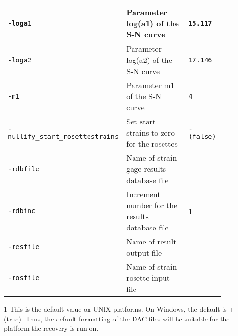 \begin{threeparttable}[b]
\begin{tabular}{|>{\raggedright} p{0.23\linewidth}| p{0.48\linewidth}| p{0.18\linewidth}|}
  \hline
  \texttt{-loga1} &    Parameter log(a1) of the S-N curve  & \texttt{15.117}   \\
  \hline
  \texttt{-loga2} &    Parameter log(a2) of the S-N curve  & \texttt{17.146}   \\
  \hline
  \texttt{-m1} &    Parameter m1 of the S-N curve  & \texttt{4}   \\
  \hline
  \texttt{-nullify\_start\_}\newline\texttt{rosettestrains} &    Set start strains to zero for the rosettes  & \texttt{- (false)}   \\
  \hline
  {\tt-rdbfile} & Name of strain gage results database file & \\
  \hline
  {\tt-rdbinc} & Increment number for the results database file & 1 \\
  \hline
  {\tt-resfile} & Name of result output file & \\
  \hline
  {\tt-rosfile} & Name of strain rosette input file & \\
  \hline
\end{tabular}
  \begin{tablenotes}
    \item[1] { This is the default value on UNIX platforms. On Windows, the default is + (true).
    Thus, the default formatting of the DAC files will be suitable for the platform the
    recovery is run on.}
  \end{tablenotes}
\end{threeparttable}

\clearpage
{}

